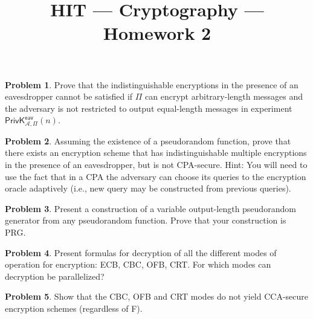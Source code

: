 \documentclass[11pt]{article}
\title{HIT --- Cryptography --- Homework 2}
\theoremstyle{definition}
\newtheorem{problem}{Problem}
\begin{document}
\maketitle

\begin{problem}
Prove that the indistinguishable encryptions in the presence of an eavesdropper cannot be satisfied if $\Pi$ can encrypt arbitrary-length messages and the adversary is not restricted to output equal-length messages in experiment $\mathsf{PrivK}^{\mathsf{eav}}_{\mathcal{A},\Pi}(n)$.
\end{problem}

\begin{problem}
Assuming the existence of a pseudorandom function, prove that there exists an encryption scheme that has indistinguishable multiple encryptions in the presence of an eavesdropper, but is not CPA-secure.
{\small Hint: You will need to use the fact that in a CPA the adversary can choose its queries to the encryption oracle adaptively (i.e., new query may be constructed from previous queries).}
\end{problem}

\begin{problem}
Present a construction of a variable output-length pseudorandom generator from any pseudorandom function. Prove that your construction is PRG.
\end{problem}

\begin{problem}
Present formulas for decryption of all the different modes of operation for encryption: ECB, CBC, OFB, CRT. For which modes can decryption be parallelized?
\end{problem}

\begin{problem}
Show that the CBC, OFB and CRT modes do not yield CCA-secure encryption schemes (regardless of F).
\end{problem}
\end{document}
